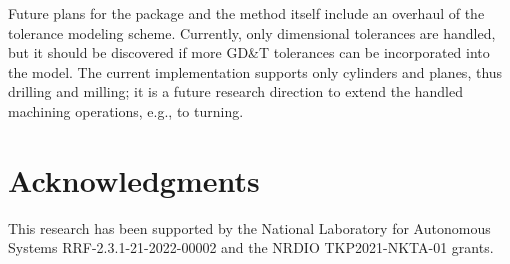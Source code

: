 \documentclass{juliacon}
\begin{document}
Future plans for the package and the method itself include an overhaul of the tolerance modeling scheme.
Currently, only dimensional tolerances are handled, but it should be discovered if more GD\&T tolerances can be incorporated into the model.
The current implementation supports only cylinders and planes, thus drilling and milling; it is a future research direction to extend the handled machining operations, e.g., to turning.



\section{Acknowledgments}
This research has been supported by the National Laboratory for Autonomous Systems RRF-2.3.1-21-2022-00002 and the NRDIO TKP2021-NKTA-01 grants.


\end{document}

